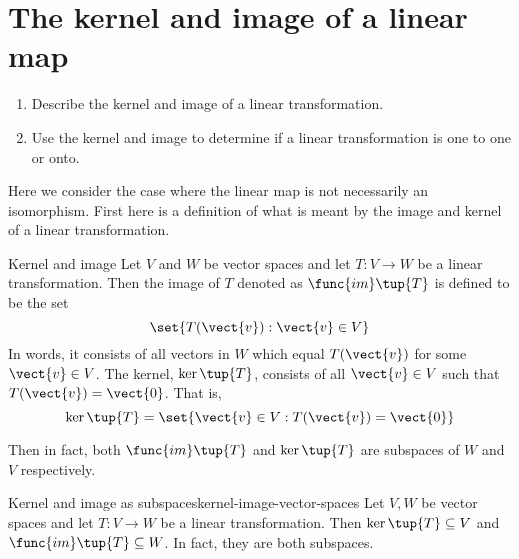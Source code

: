 \section{The kernel and image of a linear map}

\begin{outcome}
  \begin{enumerate}
  \item Describe the kernel and image of a linear transformation.
  \item Use the kernel and image to determine if a linear
    transformation is one to one or onto.
  \end{enumerate}
\end{outcome}

Here we consider the case where the linear map is not necessarily an
isomorphism. First here is a definition of what is meant by the image and
kernel of a linear transformation.

\begin{definition}{Kernel and image}{}
Let $V$ and $W$ be vector spaces and let $T:V\rightarrow W$ be a linear transformation. Then the image of $T$
denoted as $\func{im}\tup{T} $ is defined to be the set 
\begin{equation*}
\set{T(\vect{v}):\vect{v}\in V}
\end{equation*}
In words, it consists of all vectors in $W$ which equal $T(\vect{v})$ for some $
\vect{v}\in V$. The kernel, $\ker \tup{T}$, 
consists of all $\vect{v}\in V$ such that $T(\vect{v})=\vect{0}$. That is, 
\begin{equation*}
\ker \tup{T} =\set{\vect{v}\in V:T(\vect{v})=\vect{0}}
\end{equation*}
\end{definition}

Then in fact, both $\func{im}\tup{T} $ and $\ker \tup{T} $
are subspaces of $W$ and $V$ respectively.

\begin{proposition}{Kernel and image as subspaces}{kernel-image-vector-spaces}
Let $V,W$ be vector spaces and let $T:V\rightarrow W$ be a linear transformation. Then $\ker \tup{
T} \subseteq V$ and $\func{im}\tup{T} \subseteq W$. In fact, they are both subspaces. 
\end{proposition}

